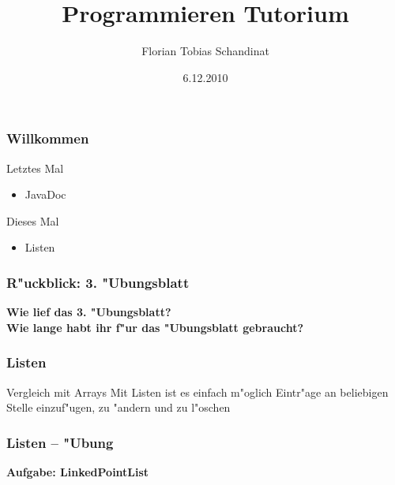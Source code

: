 \documentclass{beamer}
\title{Programmieren Tutorium}
\author{Florian Tobias Schandinat}
\date{6.12.2010}
\institute{FTS}
\begin{document}
\begin{frame}
\frametitle{Willkommen}
\pause
\begin{alertblock}{Letztes Mal}
\begin{itemize}
\item JavaDoc
\end{itemize}
\end{alertblock}

\pause

\begin{block}{Dieses Mal}
\begin{itemize}
\item Listen
\end{itemize}
\end{block}
\end{frame}


\begin{frame}
\frametitle{R"uckblick: 3. "Ubungsblatt}
\begin{center}
\textbf{\Huge Wie lief das 3. "Ubungsblatt?\pause\\[2em]
Wie lange habt ihr f"ur das "Ubungsblatt gebraucht?}
\end{center}
\end{frame}


\begin{frame}
\frametitle{Listen} 
\begin{block}{Vergleich mit Arrays}\pause
Mit Listen ist es einfach m"oglich Eintr"age an beliebigen Stelle einzuf"ugen, zu "andern und zu l"oschen
\end{block}
\end{frame}


\begin{frame}
\frametitle{Listen -- "Ubung}
\begin{center}
\textbf{\Huge Aufgabe: LinkedPointList}
\end{center}
\end{frame}
\end{document}
